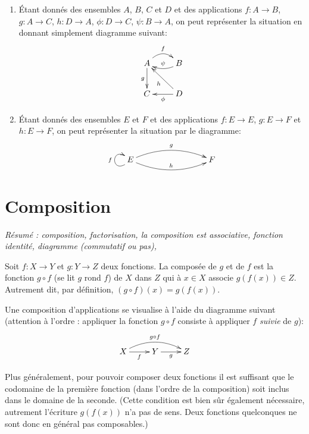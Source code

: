 \begin{exemple}
\begin{enumerate}
\item \'Etant donnés des ensembles $A$, $B$, $C$ et $D$ et des applications $f : A\to B$, $g : A\to C$, $h : D\to A$, $\phi : D\to C$, $\psi : B\to A$, on peut représenter la situation en donnant simplement diagramme suivant:
\[
\xymatrix{
A \ar@/^1pc/[r]^{f} \ar[d]_{g} & B \ar@/^/[l]_{\psi}\\
C & D \ar[ul]^{h} \ar[l]^{\phi}
}
\]
\item \'Etant donnés des ensembles $E$ et $F$ et des applications $f : E\to E$, $g : E\to F$ et $h : E\to F$, on peut représenter la situation par le diagramme:
\[
\xymatrix{
 E \ar@(dl,ul)^{f} \ar@/^1pc/[rrr]^{g} \ar@/_1pc/[rrr]^{h}
& & &  F 
}
\]
\end{enumerate}
\end{exemple}



\section{Composition}

\emph{Résumé : composition, factorisation, la composition est associative, fonction identité, diagramme (commutatif ou pas), }




\begin{definition}[Composition]
Soit $f : X\to Y$ et $g : Y\to Z$ deux fonctions. La composée de $g$ et de $f$ est la fonction $g\circ f$ (se lit \og $g$ rond $f$\fg) de $X$ dans $Z$ qui à $x\in X$ associe $g(f(x)) \in Z$. Autrement dit, par définition, $(g\circ f)(x) = g(f(x))$.

Une composition d'applications se visualise à l'aide du diagramme suivant (attention à l'ordre : appliquer la fonction $g\circ f$ consiste à appliquer $f$ \emph{suivie} de $g$):
\[
\xymatrix{
X \ar[r]_{f} \ar@/^1pc/[rr]^{g\circ f}& Y \ar[r]_{g}& Z
}
\]
\end{definition}

Plus généralement, pour pouvoir composer deux fonctions il est suffisant que le codomaine de la première fonction (dans l'ordre de la composition) soit inclus dans le domaine de la seconde. (Cette condition est bien sûr également nécessaire, autrement l'écriture $g(f(x))$ n'a pas de sens. Deux fonctions quelconques ne sont donc en général pas composables.)

